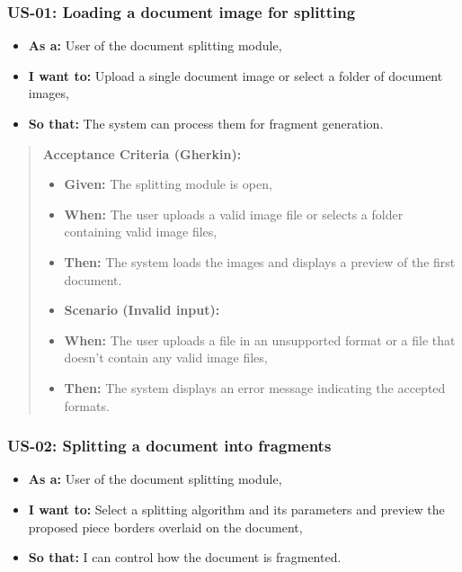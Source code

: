 \documentclass[
]{article}
\providecommand{\tightlist}{%
  \setlength{\itemsep}{0pt}\setlength{\parskip}{0pt}}
\begin{document}
\subsubsection{\texorpdfstring{\textbf{US-01: Loading a document image
for
splitting}}{US-01: Loading a document image for splitting}}\label{us-01-loading-a-document-image-for-splitting}

\begin{itemize}
\tightlist
\item
  \textbf{As a:} User of the document splitting module,
\item
  \textbf{I want to:} Upload a single document image or select a folder
  of document images,
\item
  \textbf{So that:} The system can process them for fragment generation.
\end{itemize}

\begin{quote}
\textbf{Acceptance Criteria (Gherkin):}

\begin{itemize}
\tightlist
\item
  \textbf{Given:} The splitting module is open,
\item
  \textbf{When:} The user uploads a valid image file or selects a folder
  containing valid image files,
\item
  \textbf{Then:} The system loads the images and displays a preview of
  the first document.
\item
  \textbf{Scenario (Invalid input):}
\item
  \textbf{When:} The user uploads a file in an unsupported format or a
  file that doesn't contain any valid image files,
\item
  \textbf{Then:} The system displays an error message indicating the
  accepted formats.
\end{itemize}
\end{quote}

\subsubsection{\texorpdfstring{\textbf{US-02: Splitting a document into
fragments}}{US-02: Splitting a document into fragments}}\label{us-02-splitting-a-document-into-fragments}

\begin{itemize}
\tightlist
\item
  \textbf{As a:} User of the document splitting module,
\item
  \textbf{I want to:} Select a splitting algorithm and its parameters
  and preview the proposed piece borders overlaid on the document,
\item
  \textbf{So that:} I can control how the document is fragmented.
\end{itemize}
\end{document}
